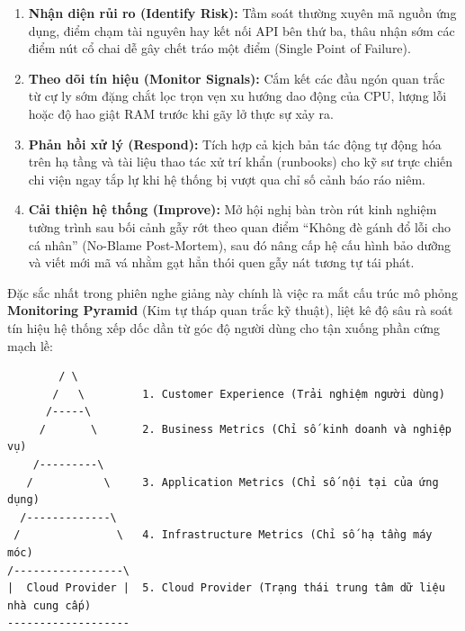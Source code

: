\begin{enumerate}
\def\labelenumi{\arabic{enumi}.}
\tightlist
\item
  \textbf{Nhận diện rủi ro (Identify Risk):} Tầm soát thường xuyên mã
  nguồn ứng dụng, điểm chạm tài nguyên hay kết nối API bên thứ ba, thâu
  nhận sớm các điểm nút cổ chai dễ gây chết tráo một điểm (Single Point
  of Failure).
\item
  \textbf{Theo dõi tín hiệu (Monitor Signals):} Cắm kết các đầu ngón
  quan trắc từ cự ly sớm đặng chắt lọc trọn vẹn xu hướng dao động của
  CPU, lượng lỗi hoặc độ hao giật RAM trước khi gãy lở thực sự xảy ra.
\item
  \textbf{Phản hồi xử lý (Respond):} Tích hợp cả kịch bản tác động tự
  động hóa trên hạ tầng và tài liệu thao tác xử trí khẩn (runbooks) cho
  kỹ sư trực chiến chi viện ngay tắp lự khi hệ thống bị vượt qua chỉ số
  cảnh báo ráo niêm.
\item
  \textbf{Cải thiện hệ thống (Improve):} Mở hội nghị bàn tròn rút kinh
  nghiệm tường trình sau bối cảnh gẫy rớt theo quan điểm ``Không đè gánh
  đổ lỗi cho cá nhân'' (No-Blame Post-Mortem), sau đó nâng cấp hệ cấu
  hình bảo dưỡng và viết mới mã vá nhằm gạt hẳn thói quen gẫy nát tương
  tự tái phát.
\end{enumerate}

Đặc sắc nhất trong phiên nghe giảng này chính là việc ra mắt cấu trúc mô
phỏng \textbf{Monitoring Pyramid} (Kim tự tháp quan trắc kỹ thuật), liệt
kê độ sâu rà soát tín hiệu hệ thống xếp dốc dần từ góc độ người dùng cho
tận xuống phần cứng mạch lề:

\begin{verbatim}
        / \
       /   \         1. Customer Experience (Trải nghiệm người dùng)
      /-----\
     /       \       2. Business Metrics (Chỉ số kinh doanh và nghiệp vụ)
    /---------\
   /           \     3. Application Metrics (Chỉ số nội tại của ứng dụng)
  /-------------\
 /               \   4. Infrastructure Metrics (Chỉ số hạ tầng máy móc)
/-----------------\
|  Cloud Provider |  5. Cloud Provider (Trạng thái trung tâm dữ liệu nhà cung cấp)
-------------------
\end{verbatim}

